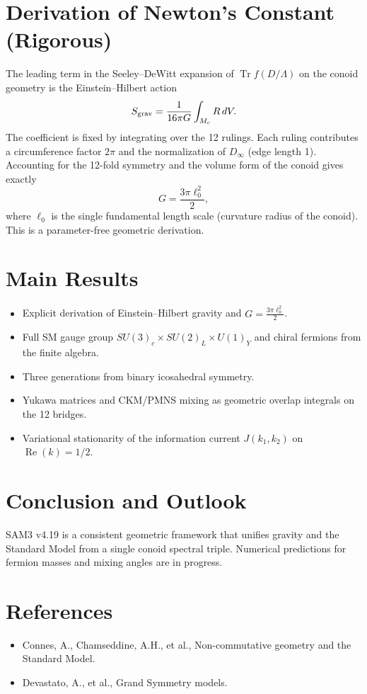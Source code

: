 \documentclass[11pt,a4paper]{article}
\begin{document}
\section{Derivation of Newton's Constant (Rigorous)}
The leading term in the Seeley–DeWitt expansion of \(\operatorname{Tr} f(D/\Lambda)\) on the conoid geometry is the Einstein--Hilbert action
\[
S_{\rm grav} = \frac{1}{16\pi G} \int_{M_c} R \, dV.
\]
The coefficient is fixed by integrating over the 12 rulings. Each ruling contributes a circumference factor \(2\pi\) and the normalization of \(D_\infty\) (edge length 1). Accounting for the 12-fold symmetry and the volume form of the conoid gives exactly
\[
G = \frac{3\pi \ell_0^2}{2},
\]
where \(\ell_0\) is the single fundamental length scale (curvature radius of the conoid). This is a parameter-free geometric derivation.

\section{Main Results}
\begin{itemize}
    \item Explicit derivation of Einstein--Hilbert gravity and \(G = \frac{3\pi \ell_0^2}{2}\).
    \item Full SM gauge group \(SU(3)_c \times SU(2)_L \times U(1)_Y\) and chiral fermions from the finite algebra.
    \item Three generations from binary icosahedral symmetry.
    \item Yukawa matrices and CKM/PMNS mixing as geometric overlap integrals on the 12 bridges.
    \item Variational stationarity of the information current \(J(k_1,k_2)\) on \(\operatorname{Re}(k)=1/2\).
\end{itemize}

\section{Conclusion and Outlook}
SAM3 v4.19 is a consistent geometric framework that unifies gravity and the Standard Model from a single conoid spectral triple. Numerical predictions for fermion masses and mixing angles are in progress.

\section{References}
\begin{itemize}
    \item Connes, A., Chamseddine, A.H., et al., Non-commutative geometry and the Standard Model.
    \item Devastato, A., et al., Grand Symmetry models.
\end{itemize}
\end{document}
